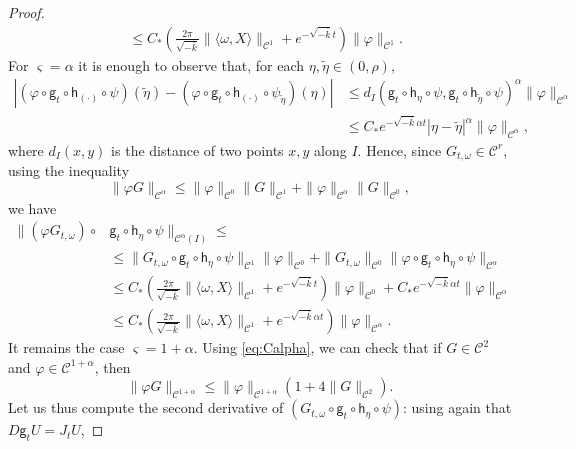 \documentclass[10pt,a4paper]{amsart}
\newcommand \cC {{\mathscr{C}}}
\newcommand{\geo}{\mathsf{g}}
\newcommand{\horo}{\mathsf{h}}
\begin{document}
\begin{proof}
\begin{equation}
\begin{split}
&\le C_*\left(\frac{2\pi  }{\sqrt{-\overline k}}\|\langle \omega, X \rangle \|_{\cC^1} +e^{-\sqrt{-\overline k}t}\right)\|\varphi\|_{\cC^1}.
\end{split}
\end{equation}
For $\varsigma=\alpha$ it is enough to observe that, for each $\eta,\tilde \eta \in (0,\rho)$,
\begin{equation}\label{eq:Holder}
\begin{split}
|(\varphi \circ \geo_t\circ \horo_{(\cdot)}\circ \psi)(\tilde\eta)- (\varphi \circ \geo_t\circ \horo_{(\cdot)}\circ \psi_{\tilde\eta})(\eta)| 
&\le d_{I}(\geo_t\circ \horo_\eta\circ \psi,\geo_t\circ \horo_{\tilde \eta}\circ \psi )^{\alpha} \|\varphi\|_{\cC^\alpha}  \\
&\le C_* e^{-\sqrt{-\overline k} \alpha t}|\eta-\tilde \eta|^{\alpha}  \|\varphi\|_{\cC^\alpha},
\end{split}
\end{equation}
where $d_I(x,y)$ is the distance of two points $x,y$ along $I$. Hence, since $G_{t,\omega}\in \cC^r$, using the inequality
\begin{equation}\label{eq:Calpha}
\|\varphi G\|_{\cC^\alpha} \le \|\varphi\|_{\cC^0}\|G\|_{\cC^1}+\|\varphi\|_{\cC^\alpha}\|G\|_{\cC^0},
\end{equation}
we have
\[
\begin{split}
\|(\varphi G_{t,\omega})\circ & \geo_t\circ \horo_\eta\circ \psi \|_{\cC^\alpha(I)}\le \\
&\le \|G_{t,\omega}\circ \geo_t\circ \horo_\eta\circ \psi\|_{\cC^1}\|\varphi\|_{\cC^0}+\|G_{t,\omega}\|_{\cC^0}\|\varphi\circ \geo_t\circ \horo_\eta\circ \psi\|_{\cC^{\alpha}}\\
&\le  C_*\left(\frac{2\pi }{\sqrt{-\overline k}}\|\langle \omega, X \rangle \|_{\cC^1} +e^{-\sqrt{-\overline k}t}\right)\|\varphi\|_{\cC^0}+C_* e^{-\sqrt{-\overline k} \alpha t}  \|\varphi\|_{\cC^\alpha}\\
&\le C_*\left(\frac{2\pi }{\sqrt{-\overline k}}\|\langle \omega, X \rangle \|_{\cC^1} + e^{-\sqrt{-\overline k} \alpha t}  \right) \|\varphi\|_{\cC^\alpha}.
\end{split}
\]
It remains the case $\varsigma=1+\alpha$. Using \eqref{eq:Calpha}, we can check that if $G\in \cC^2$ and $\varphi \in \cC^{1+\alpha}$, then 
\begin{equation}\label{eq:C1+}
\|\varphi G\|_{\cC^{1+\alpha}}\le  \|\varphi\|_{\cC^{1+\alpha}}(1+4\|G\|_{\cC^{2}}).
\end{equation}
 Let us thus compute the second derivative of $(G_{t,\omega}\circ \geo_t\circ \horo_\eta \circ \psi)$: using again that $D\geo_tU=J_t U$,

\end{proof}
\end{document}
